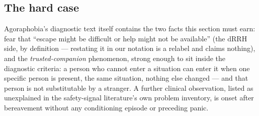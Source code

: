 \documentclass[9pt,twocolumn]{article}
\newcommand{\dRRH}{\mathrm{dRRH}}
\begin{document}
\subsection{The hard case}
Agoraphobia's diagnostic text itself contains the two facts this section must earn: fear that ``escape might be difficult or help might not be available'' (the $\dRRH$ side, by definition --- restating it in our notation is a relabel and claims nothing), and the \emph{trusted-companion} phenomenon, strong enough to sit inside the diagnostic criteria: a person who cannot enter a situation can enter it when one specific person is present, the same situation, nothing else changed --- and that person is not substitutable by a stranger. A further clinical observation, listed as unexplained in the safety-signal literature's own problem inventory, is onset after bereavement without any conditioning episode or preceding panic.
\end{document}
